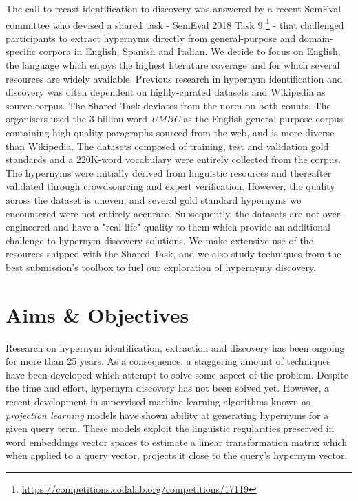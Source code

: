 The call to recast identification to discovery was answered by a recent SemEval committee who devised a shared task - SemEval 2018 Task 9 \footnote{\url{https://competitions.codalab.org/competitions/17119}} - that challenged participants to extract hypernyms directly from general-purpose and domain-specific corpora in English, Spanish and Italian.  We decide to focus on English, the language which enjoys the highest literature coverage and for which several resources are widely available.  Previous research in hypernym identification and discovery was often dependent on highly-curated datasets and Wikipedia as source corpus.  The Shared Task deviates from the norm on both counts.  The organisers used the 3-billion-word \textit{UMBC} as the English general-purpose corpus containing high quality paragraphs sourced from the web, and is more diverse than Wikipedia.  The datasets composed of training, test and validation gold standards and a 220K-word vocabulary were entirely collected from the corpus.  The hypernyms were initially derived from linguistic resources and thereafter validated through crowdsourcing and expert verification.  However, the quality across the dataset is uneven, and several gold standard hypernyms we encountered were not entirely accurate.  Subsequently, the datasets are not over-engineered and have a "real life" quality to them which provide an additional challenge to hypernym discovery solutions.  We make extensive use of the resources shipped with the Shared Task, and we also study techniques from the best submission's toolbox to fuel our exploration of hypernymy discovery.

\section{Aims \& Objectives}
Research on hypernym identification, extraction and discovery has been ongoing for more than 25 years.  As a consequence, a staggering amount of techniques have been developed which attempt to solve some aspect of the problem.  Despite the time and effort, hypernym discovery has not been solved yet.  However, a recent development in supervised machine learning algorithms known as \textit{projection learning} models have shown ability at generating hypernyms for a given query term.  These models exploit the  linguistic regularities preserved in word embeddings vector spaces to estimate a linear transformation matrix which when applied to a query vector, projects it close to the query's hypernym vector.

